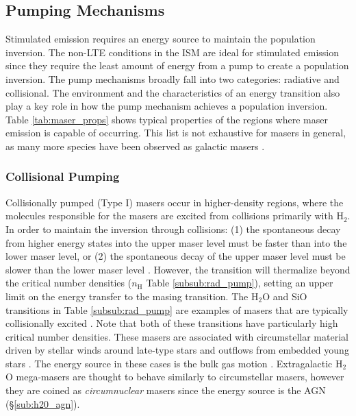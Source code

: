 \subsection{Pumping Mechanisms}
\label{sub:pumping}

Stimulated emission requires an energy source to maintain the population inversion.  The non-LTE conditions in the ISM are ideal for stimulated emission since they require the least amount of energy from a pump to create a population inversion.  The pump mechanisms broadly fall into two categories: radiative and collisional.  The environment and the characteristics of an energy transition also play a key role in how the pump mechanism achieves a population inversion.  Table \ref{tab:maser_props} shows typical properties of the regions where maser emission is capable of occurring.  This list is not exhaustive for masers in general, as many more species have been observed as galactic masers \citep[e.g., ]{Elitzur_1992}. 

\subsubsection{Collisional Pumping}
\label{subsub:coll_pump}

Collisionally pumped (Type I) masers occur in higher-density regions, where the molecules responsible for the masers are excited from collisions primarily with H$_2$. In order to maintain the inversion through collisions: (1) the spontaneous decay from higher energy states into the upper maser level must be faster than into the lower maser level, or (2) the spontaneous decay of the upper maser level must be slower than the lower maser level \citep{Goldreich_1974}. However, the transition will thermalize beyond the critical number densities ($n_{\mathrm{H}}$ Table \ref{subsub:rad_pump}), setting an upper limit on the energy transfer to the masing transition.  The H$_2$O and SiO transitions in Table \ref{subsub:rad_pump} are examples of masers that are typically collisionally excited \citep{Elitzur_1992}. Note that both of these transitions have particularly high critical number densities. These masers are associated with circumstellar material driven by stellar winds around late-type stars and outflows from embedded young stars \citep{Elitzur_1992}. The energy source in these cases is the bulk gas motion \citep{stahler_palla_2004}. Extragalactic H$_2$O mega-masers are thought to behave similarly to circumstellar masers, however they are coined as {\it circumnuclear} masers since the energy source is the AGN (\S\ref{sub:h20_agn}). 

